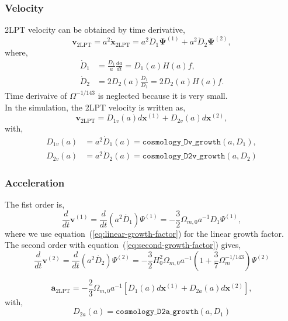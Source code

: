\documentclass[a4paper]{article}
\begin{document}
\subsubsection{Velocity}
2LPT velocity can be obtained by time derivative,
%
\begin{equation}
  \bm{v}_\mathrm{2LPT} = a^2 \dot{\bm{x}}_\mathrm{2LPT} =
    a^2 \dot{D}_1 \bm{\Psi}^{(1)} + a^2 \dot{D}_2 \bm{\Psi}^{(2)},
\end{equation}
where,
\begin{align}
  \dot{D}_1 &= \frac{D_1}{a}\frac{da}{dt} = D_1(a) H(a) f,\\
  \dot{D}_2 &= 2 D_2(a) \frac{\dot{D}_1}{D_1} = 2 D_2(a) H(a) f.
\end{align}
Time derivaive of $\Omega^{-1/143}$ is neglected because it is very
small.\\


\noindent In the simulation, the 2LPT velocity is written as,
\begin{equation}
  \bm{v}_\mathrm{2LPT} = D_{1v}(a) d\bm{x}^{(1)} + D_{2v}(a) d\bm{x}^{(2)},
\end{equation}
with,
\begin{align}
  D_{1v}(a) &= a^2 \dot{D}_1(a) = \texttt{cosmology\_Dv\_growth}(a, D_1),\\
  D_{2v}(a) &= a^2 \dot{D}_2(a) = \texttt{cosmology\_D2v\_growth}(a, D_2)
\end{align}

\subsubsection{Acceleration}
The fist order is,
\begin{equation}
  \frac{d}{dt}\bm{v}^{(1)} = \frac{d}{dt} (a^2 \dot{D_1}) \Psi^{(1)}
  = -\frac{3}{2} \Omega_{m,0} a^{-1} D_1 \Psi^{(1)},
\end{equation}
where we use equation~(\ref{eq:linear-growth-factor}) for the linear growth factor. The second order with equation~(\ref{eq:second-growth-factor}) gives,
\begin{equation}
  \frac{d}{dt}\bm{v}^{(2)} = \frac{d}{dt} (a^2 \dot{D_2}) \Psi^{(2)}
  = -\frac{3}{2} H_0^2 \Omega_{m,0} a^{-1}
    \left(1 + \frac{3}{7} \Omega_m^{-1/143}\right) \Psi^{(2)}
\end{equation}

\begin{equation}
  \bm{a}_\mathrm{2LPT} = -\frac{2}{3} \Omega_{m,0} a^{-1} \left[ D_{1}(a) d\bm{x}^{(1)} + D_{2a}(a) d\bm{x}^{(2)} \right],
\end{equation}
with,
\begin{equation}
  D_{2a}(a) = \texttt{cosmology\_D2a\_growth}(a, D_1)
\end{equation}
\end{document}
